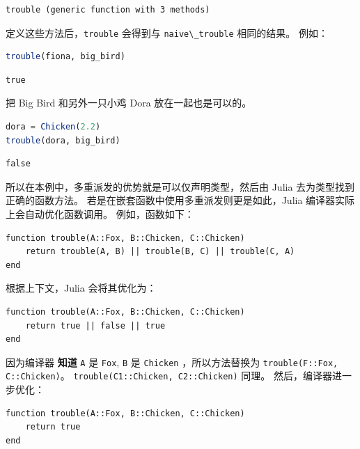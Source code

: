 \documentclass[
  notoc %
]{tufte-book}
\newcommand{\passthrough}[1]{#1}
\begin{document}
\begin{lstlisting}[language=Output]
trouble (generic function with 3 methods)
\end{lstlisting}

定义这些方法后，\passthrough{\lstinline!trouble!} 会得到与
\passthrough{\lstinline!naive\_trouble!} 相同的结果。 例如：

\begin{lstlisting}[language=Julia]
trouble(fiona, big_bird)
\end{lstlisting}

\begin{lstlisting}[language=Output]
true
\end{lstlisting}

把 Big Bird 和另外一只小鸡 Dora 放在一起也是可以的。

\begin{lstlisting}[language=Julia]
dora = Chicken(2.2)
trouble(dora, big_bird)
\end{lstlisting}

\begin{lstlisting}[language=Output]
false
\end{lstlisting}

所以在本例中，多重派发的优势就是可以仅声明类型，然后由 Julia
去为类型找到正确的函数方法。
若是在嵌套函数中使用多重派发则更是如此，Julia
编译器实际上会自动优化函数调用。 例如，函数如下：

\begin{lstlisting}
function trouble(A::Fox, B::Chicken, C::Chicken)
    return trouble(A, B) || trouble(B, C) || trouble(C, A)
end
\end{lstlisting}

根据上下文，Julia 会将其优化为：

\begin{lstlisting}
function trouble(A::Fox, B::Chicken, C::Chicken)
    return true || false || true
end
\end{lstlisting}

因为编译器 \textbf{知道} \passthrough{\lstinline!A!} 是
\passthrough{\lstinline!Fox!}, \passthrough{\lstinline!B!} 是
\passthrough{\lstinline!Chicken!} ，所以方法替换为
\passthrough{\lstinline!trouble(F::Fox, C::Chicken)!}。
\passthrough{\lstinline!trouble(C1::Chicken, C2::Chicken)!} 同理。
然后，编译器进一步优化：

\begin{lstlisting}
function trouble(A::Fox, B::Chicken, C::Chicken)
    return true
end
\end{lstlisting}
\end{document}
